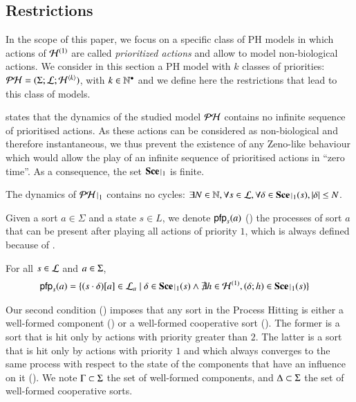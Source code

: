 \subsection{Restrictions}
\label{ssec:hypothesis}

In the scope of this paper, we focus on a specific class of PH models
in which actions of $\mathcal{H}^{(1)}$ are called \emph{prioritized actions} and allow to model non-biological actions.
We consider in this section a PH model with $k$ classes of priorities: $\mathcal{PH} = (\Sigma; \mathcal{L}; \mathcal{H}^{\langle k \rangle})$, with $k \in \mathbb{N}^\bullet$
and we define here the restrictions that lead to this class of models.

 states that the dynamics of the studied model $\mathcal{PH}$ contains no infinite sequence of prioritised actions.
As these actions can be considered as non-biological and therefore instantaneous, we thus prevent the existence of any Zeno-like behaviour
which would allow the play of an infinite sequence of prioritised actions in “zero time”.
As a consequence, the set $\restriction{\Sce}{1}$ is finite.

\begin{condition}
\label{cr:bounded}
  The dynamics of $\restriction{\PH}{1}$ contains no cycles:
  $\exists N \in \sN, \forall s \in \PHl, \forall \delta \in \restriction{\Sce}{1}(s), |\delta| \leq N$.
\end{condition}

Given a sort $a\in\Sigma$ and a state $s\in L$, 
we denote $\mathsf{pfp}_s(a)$ () the processes of sort $a$ that can be present after
playing all actions of priority $1$,
which is always defined because of .

\begin{definition}[$\pfp : \PHl \times \PHs \rightarrow \powerset(\PHproc)$]
\label{def:pfp}
  For all $s \in \mathcal{L}$ and $a \in \Sigma$,
  \begin{align*}
    \pfp_s(a) = \{ \get{(s\play\delta)}{a} \in \PHl_a &\mid \delta \in \restriction{\Sce}{1}(s)
					\wedge\nexists h\in\PHh^{(1)}, (\delta; h) \in\restriction{\Sce}{1}(s) \}
  \end{align*}
\end{definition}

Our second condition () imposes that any sort in the Process
Hitting is either a well-formed component () or a well-formed cooperative sort
().
The former is a sort that is hit only by actions with priority greater than $2$.
The latter is a sort that is hit only by actions with priority $1$ and which
always converges to the same process with respect to the state of the components
that have an influence on it ().
We note $\Gamma\subset\Sigma$ the set of well-formed components,
and $\Delta\subset\Sigma$ the set of well-formed cooperative sorts.

